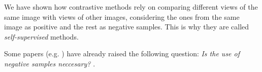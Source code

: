 \label{Chapter:BYOL}

We have shown how contrastive methods rely on comparing different views of the same image with views of other images, considering the ones from the same image as positive and the rest as negative samples. This is why they are called \emph{self-supervised} methods.

Some papers (e.g. \cite{caron2019deep}) have already raised the following question: \emph{ Is the use of negative samples neccesary? }.